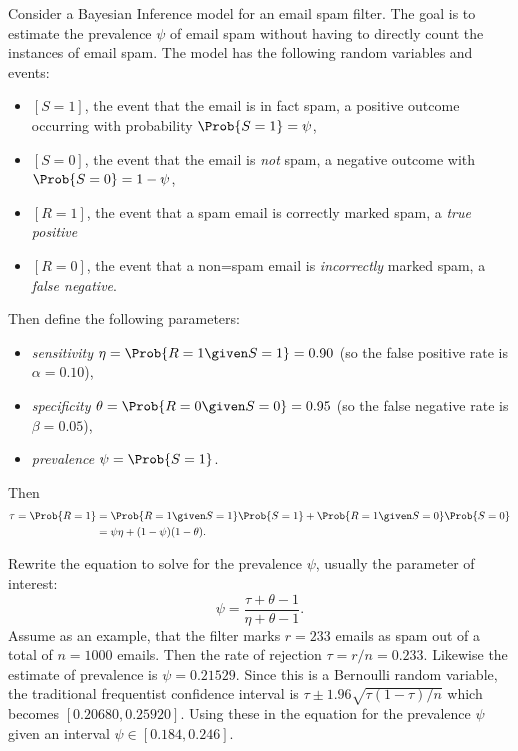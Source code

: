 \documentclass[12pt]{article}
\begin{document}
Consider a Bayesian Inference model for an email spam filter. The goal
is to estimate the prevalence \( \psi \) of email spam without having to
directly count the instances of email spam.  The model has the following
random variables and events:
\begin{itemize}
    \item
        \( [S=1] \), the event that the email is in fact spam, a
        positive outcome occurring with probability \( \Prob{S=1} = \psi
        \),
    \item
        \( [S=0] \), the event that the email is \emph{not} spam, a
        negative outcome with \( \Prob{S = 0} = 1 - \psi \),
    \item
        \( [R=1] \), the event that a spam email is correctly marked spam,
        a \emph{true positive}
    \item
        \( [R=0] \), the event that a non=spam email is \emph{incorrectly}
        marked spam, a \emph{false negative}.
\end{itemize}
Then define the following parameters:
\begin{itemize}
    \item
        \emph{sensitivity} \( \eta = \Prob{R = 1 \given S =1} = 0.90 \) (so
        the false positive rate is \( \alpha = 0.10 \)),
    \item
        \emph{specificity} \( \theta = \Prob{R = 0 \given S = 0} = 0.95 \)
        (so the false negative rate is \( \beta = 0.05 \)),
    \item
        \emph{prevalence} \( \psi = \Prob{S = 1} \).
\end{itemize}
Then
\begin{align*}
    \tau = \Prob{R = 1} &= \Prob{R = 1 \given S =1} \Prob{S = 1} + \Prob{R
                          = 1 \given S =0} \Prob{S = 0} \\
                        &= \psi \eta + (1 - \psi)(1-\theta).
\end{align*}

Rewrite the equation to solve for the prevalence \( \psi \), usually the
parameter of interest:
\[
    \psi = \frac{\tau + \theta - 1}{\eta + \theta -1}.
\] Assume as an example, that the filter marks \( r = 233 \) emails as
spam out of a total of \( n = 1000 \) emails.  Then the rate of
rejection \( \tau = r/n = 0.233 \).  Likewise the estimate of prevalence
is \( \psi = 0.21529 \). Since this is a Bernoulli random variable, the
traditional frequentist confidence interval is \( \tau \pm 1.96 \sqrt{\tau
(1-\tau)/n} \) which becomes \( [0.20680, 0.25920] \).  Using these in
the equation for the prevalence \( \psi \) given an interval \( \psi \in
[0.184, 0.246] \).
\end{document}
